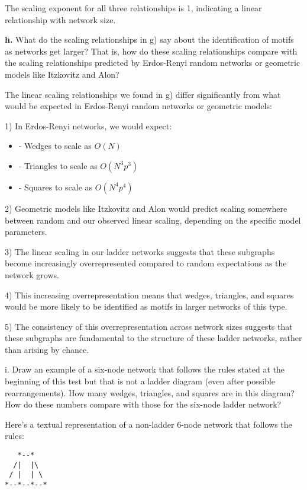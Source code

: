 \documentclass{article}
\begin{document}
The scaling exponent for all three relationships is 1, indicating a linear relationship with network size.

\textbf{h.} What do the scaling relationships in g) say about the identification of motifs as networks get larger? That is, how do these scaling relationships compare with the scaling relationships predicted by Erdos-Renyi random networks or geometric models like Itzkovitz and Alon?

The linear scaling relationships we found in g) differ significantly from what would be expected in Erdos-Renyi random networks or geometric models:

1) In Erdos-Renyi networks, we would expect:
   \begin{itemize}
       \item - Wedges to scale as $O(N)$
       \item - Triangles to scale as $O(N^3p^3)$
       \item - Squares to scale as $O(N^4p^4)$
   \end{itemize}

2) Geometric models like Itzkovitz and Alon would predict scaling somewhere between random and our observed linear scaling, depending on the specific model parameters.

3) The linear scaling in our ladder networks suggests that these subgraphs become increasingly overrepresented compared to random expectations as the network grows.

4) This increasing overrepresentation means that wedges, triangles, and squares would be more likely to be identified as motifs in larger networks of this type.

5) The consistency of this overrepresentation across network sizes suggests that these subgraphs are fundamental to the structure of these ladder networks, rather than arising by chance.

i. Draw an example of a six-node network that follows the rules stated at the beginning of this test but that is not a ladder diagram (even after possible rearrangements). How many wedges, triangles, and squares are in this diagram? How do these numbers compare with those for the six-node ladder network?

Here's a textual representation of a non-ladder 6-node network that follows the rules:

\begin{verbatim}
   *--*
  /|  |\
 / |  | \
*--*--*--*
\end{verbatim}
\end{document}
